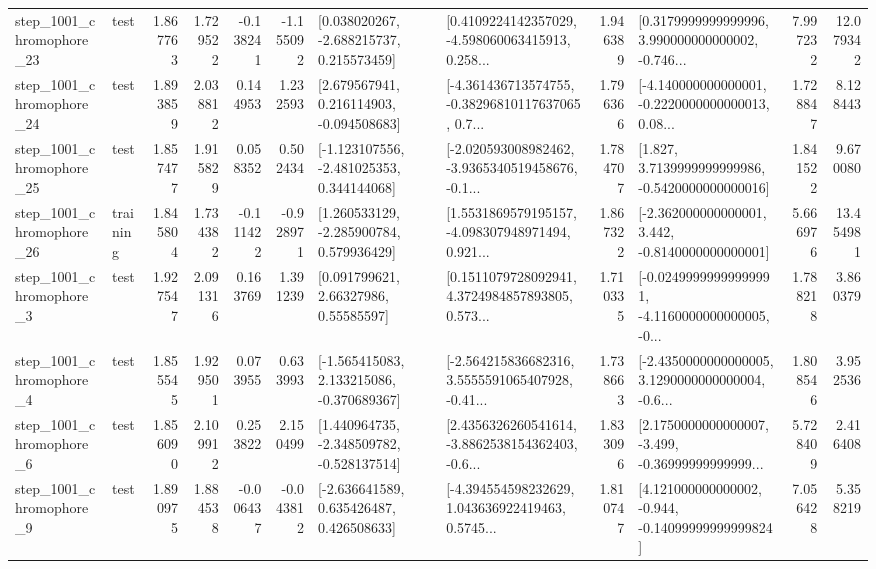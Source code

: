 \begin{tabular}{llrrrrllrlrr}
 step\_1001\_chromophore\_23 &      test &      1.867763 &    1.729522 &     -0.138241 & -1.155092 &    [0.038020267, -2.688215737, 0.215573459] &  [0.4109224142357029, -4.598060063415913, 0.258... &       1.946389 &  [0.3179999999999996, 3.990000000000002, -0.746... &            7.997232 &         12.079342 \\
 step\_1001\_chromophore\_24 &      test &      1.893859 &    2.038812 &      0.144953 &  1.232593 &    [2.679567941, 0.216114903, -0.094508683] &  [-4.361436713574755, -0.38296810117637065, 0.7... &       1.796366 &  [-4.140000000000001, -0.2220000000000013, 0.08... &            1.728847 &          8.128443 \\
 step\_1001\_chromophore\_25 &      test &      1.857477 &    1.915829 &      0.058352 &  0.502434 &   [-1.123107556, -2.481025353, 0.344144068] &  [-2.020593008982462, -3.9365340519458676, -0.1... &       1.784707 &   [1.827, 3.7139999999999986, -0.5420000000000016] &            1.841522 &          9.670080 \\
 step\_1001\_chromophore\_26 &  training &      1.845804 &    1.734382 &     -0.111422 & -0.928971 &    [1.260533129, -2.285900784, 0.579936429] &  [1.5531869579195157, -4.098307948971494, 0.921... &       1.867322 &   [-2.362000000000001, 3.442, -0.8140000000000001] &            5.666976 &         13.454981 \\
  step\_1001\_chromophore\_3 &      test &      1.927547 &    2.091316 &      0.163769 &  1.391239 &       [0.091799621, 2.66327986, 0.55585597] &  [0.1511079728092941, 4.3724984857893805, 0.573... &       1.710335 &  [-0.02499999999999991, -4.1160000000000005, -0... &            1.788218 &          3.860379 \\
  step\_1001\_chromophore\_4 &      test &      1.855545 &    1.929501 &      0.073955 &  0.633993 &   [-1.565415083, 2.133215086, -0.370689367] &  [-2.564215836682316, 3.5555591065407928, -0.41... &       1.738663 &  [-2.4350000000000005, 3.1290000000000004, -0.6... &            1.808546 &          3.952536 \\
  step\_1001\_chromophore\_6 &      test &      1.856090 &    2.109912 &      0.253822 &  2.150499 &   [1.440964735, -2.348509782, -0.528137514] &  [2.4356326260541614, -3.8862538154362403, -0.6... &       1.833096 &  [2.1750000000000007, -3.499, -0.36999999999999... &            5.728409 &          2.416408 \\
  step\_1001\_chromophore\_9 &      test &      1.890975 &    1.884538 &     -0.006437 & -0.043812 &    [-2.636641589, 0.635426487, 0.426508633] &  [-4.394554598232629, 1.043636922419463, 0.5745... &       1.810747 &  [4.121000000000002, -0.944, -0.14099999999999824] &            7.056428 &          5.358219 \\

\end{tabular}
